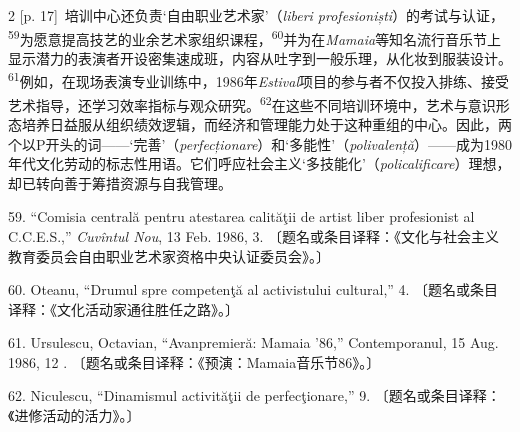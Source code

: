 \documentclass[10pt,a4paper]{article}
\begin{document}
\begin{paracol}{2}
{\scriptsize\color{gray} [p. 17]}\ 培训中心还负责‘自由职业艺术家’（\textit{liberi profesioniști}）的考试与认证，\nobreak\textsuperscript{59}为愿意提高技艺的业余艺术家组织课程，\nobreak\textsuperscript{60}并为在\textit{Mamaia}等知名流行音乐节上显示潜力的表演者开设密集速成班，内容从吐字到一般乐理，从化妆到服装设\mbox{计。\textsuperscript{61}}例如，在现场表演专业训练中，1986年\textit{Estival}项目的参与者不仅投入排练、接受艺术指导，还学习效率指标与观众研\mbox{究。\textsuperscript{62}}在这些不同培训环境中，艺术与意识形态培养日益服从组织绩效逻辑，而经济和管理能力处于这种重组的中心。因此，两个以P开头的词——‘完善’（\textit{perfecționare}）和‘多能性’（\textit{polivalență}）——成为1980年代文化劳动的标志性用语。它们呼应社会主义‘多技能化’（\textit{policalificare}）理想，却已转向善于筹措资源与自我管理。\par{\small 59. “Comisia centrală pentru atestarea calităţii de artist liber profesionist al C.C.E.S.,” \textit{Cuvîntul Nou}, 13 Feb. 1986, 3. 〔题名或条目译释：《文化与社会主义教育委员会自由职业艺术家资格中央认证委员会》。〕\par}{\small 60. Oteanu, “Drumul spre competenţă al activistului cultural,” 4. 〔题名或条目译释：《文化活动家通往胜任之路》。〕\par}{\small 61. Ursulescu, Octavian, “Avanpremieră: Mamaia ’86,” Contemporanul, 15 Aug. 1986, 12 . 〔题名或条目译释：《预演：Mamaia音乐节86》。〕\par}{\small 62. Niculescu, “Dinamismul activităţii de perfecţionare,” 9. 〔题名或条目译释：《进修活动的活力》。〕\par}
\switchcolumn

\end{paracol}
\end{document}
